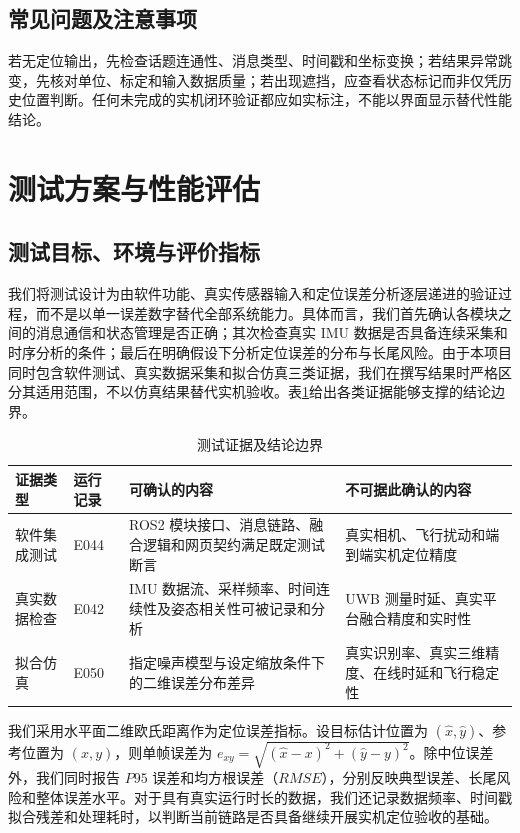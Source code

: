 \documentclass[UTF8,a4paper,12pt]{ctexart}
\begin{document}
\subsection{常见问题及注意事项}
若无定位输出，先检查话题连通性、消息类型、时间戳和坐标变换；若结果异常跳变，先核对单位、标定和输入数据质量；若出现遮挡，应查看状态标记而非仅凭历史位置判断。任何未完成的实机闭环验证都应如实标注，不能以界面显示替代性能结论。

\section{测试方案与性能评估}\label{sec:test}
\subsection{测试目标、环境与评价指标}
我们将测试设计为由软件功能、真实传感器输入和定位误差分析逐层递进的验证过程，而不是以单一误差数字替代全部系统能力。具体而言，我们首先确认各模块之间的消息通信和状态管理是否正确；其次检查真实 IMU 数据是否具备连续采集和时序分析的条件；最后在明确假设下分析定位误差的分布与长尾风险。由于本项目同时包含软件测试、真实数据采集和拟合仿真三类证据，我们在撰写结果时严格区分其适用范围，不以仿真结果替代实机验收。表\ref{tab:evidence-boundary}给出各类证据能够支撑的结论边界。

\begin{table}[htbp]
  \centering
  \small
  \caption{测试证据及结论边界}\label{tab:evidence-boundary}
  \begin{tabular}{p{2.1cm}p{2.5cm}p{4.0cm}p{4.2cm}}
    \toprule
    证据类型 & 运行记录 & 可确认的内容 & 不可据此确认的内容 \\
    \midrule
    软件集成测试 & E044 & ROS2 模块接口、消息链路、融合逻辑和网页契约满足既定测试断言 & 真实相机、飞行扰动和端到端实机定位精度 \\
    真实数据检查 & E042 & IMU 数据流、采样频率、时间连续性及姿态相关性可被记录和分析 & UWB 测量时延、真实平台融合精度和实时性 \\
    拟合仿真 & E050 & 指定噪声模型与设定缩放条件下的二维误差分布差异 & 真实识别率、真实三维精度、在线时延和飞行稳定性 \\
    \bottomrule
  \end{tabular}
\end{table}

我们采用水平面二维欧氏距离作为定位误差指标。设目标估计位置为 $(\hat{x},\hat{y})$、参考位置为 $(x,y)$，则单帧误差为 $e_{xy}=\sqrt{(\hat{x}-x)^2+(\hat{y}-y)^2}$。除中位误差外，我们同时报告 $P95$ 误差和均方根误差（$RMSE$），分别反映典型误差、长尾风险和整体误差水平。对于具有真实运行时长的数据，我们还记录数据频率、时间戳拟合残差和处理耗时，以判断当前链路是否具备继续开展实机定位验收的基础。
\end{document}
